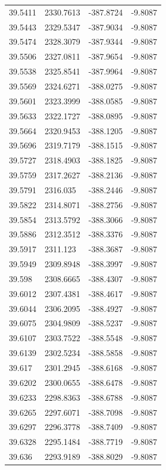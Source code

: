 \begin{table}[H]
\begin{tabular}{llll}
39.5411 & 2330.7613 & -387.8724 & -9.8087 \\
39.5443 & 2329.5347 & -387.9034 & -9.8087 \\
39.5474 & 2328.3079 & -387.9344 & -9.8087 \\
39.5506 & 2327.0811 & -387.9654 & -9.8087 \\
39.5538 & 2325.8541 & -387.9964 & -9.8087 \\
39.5569 & 2324.6271 & -388.0275 & -9.8087 \\
39.5601 & 2323.3999 & -388.0585 & -9.8087 \\
39.5633 & 2322.1727 & -388.0895 & -9.8087 \\
39.5664 & 2320.9453 & -388.1205 & -9.8087 \\
39.5696 & 2319.7179 & -388.1515 & -9.8087 \\
39.5727 & 2318.4903 & -388.1825 & -9.8087 \\
39.5759 & 2317.2627 & -388.2136 & -9.8087 \\
39.5791 & 2316.035 & -388.2446 & -9.8087 \\
39.5822 & 2314.8071 & -388.2756 & -9.8087 \\
39.5854 & 2313.5792 & -388.3066 & -9.8087 \\
39.5886 & 2312.3512 & -388.3376 & -9.8087 \\
39.5917 & 2311.123 & -388.3687 & -9.8087 \\
39.5949 & 2309.8948 & -388.3997 & -9.8087 \\
39.598 & 2308.6665 & -388.4307 & -9.8087 \\
39.6012 & 2307.4381 & -388.4617 & -9.8087 \\
39.6044 & 2306.2095 & -388.4927 & -9.8087 \\
39.6075 & 2304.9809 & -388.5237 & -9.8087 \\
39.6107 & 2303.7522 & -388.5548 & -9.8087 \\
39.6139 & 2302.5234 & -388.5858 & -9.8087 \\
39.617 & 2301.2945 & -388.6168 & -9.8087 \\
39.6202 & 2300.0655 & -388.6478 & -9.8087 \\
39.6233 & 2298.8363 & -388.6788 & -9.8087 \\
39.6265 & 2297.6071 & -388.7098 & -9.8087 \\
39.6297 & 2296.3778 & -388.7409 & -9.8087 \\
39.6328 & 2295.1484 & -388.7719 & -9.8087 \\
39.636 & 2293.9189 & -388.8029 & -9.8087 \\

\end{tabular}
\end{table}
